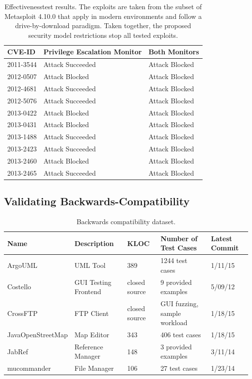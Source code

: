 \documentclass{sig-alternate}
\begin{document}
\begin{table}
\caption{Effectiveness\label{tab:Exploit-experiment-summary} test results.  The
  exploits are taken from the subset of Metasploit 4.10.0 that apply in modern
  environments and follow a drive-by-download paradigm.
  Taken together, the proposed security model restrictions stop all tested exploits.}
\begin{tabular}{l>{\raggedright}p{3cm}l}
\toprule 
\textbf{CVE-ID} & \textbf{Privilege Escalation Monitor} & \textbf{Both Monitors}\tabularnewline
\midrule
2011-3544 & Attack Succeeded  & Attack Blocked \\
2012-0507 & Attack Blocked & Attack Blocked \\
2012-4681 & Attack Succeeded  & Attack Blocked \\
2012-5076 & Attack Succeeded  & Attack Blocked \\
2013-0422 & Attack Blocked & Attack Blocked \\
2013-0431 & Attack Blocked & Attack Blocked \\
2013-1488 & Attack Succeeded  & Attack Blocked \\
2013-2423 & Attack Succeeded  & Attack Blocked \\
2013-2460 & Attack Blocked & Attack Blocked \\
2013-2465 & Attack Succeeded  & Attack Blocked \\
\bottomrule
\end{tabular}
\end{table}

\subsection{Validating Backwards-Compatibility}\label{sec:backcompat}
\begin{table}
\caption{\label{tab:validation-programs}
Backwards compatibility dataset.}
\centering

\begin{tabular}{lllll}
\toprule 
\textbf{Name} & \textbf{Description} & \textbf{KLOC} & \textbf{Number of Test Cases} & \textbf{Latest Commit}\tabularnewline
\midrule
ArgoUML & UML Tool & 389 & 1244 test cases & 1/11/15 \tabularnewline
Costello & GUI Testing Frontend & closed source & 9 provided examples & 5/09/12 \tabularnewline
CrossFTP & FTP Client & closed source & GUI fuzzing, sample workload & 1/18/15 \tabularnewline
JavaOpenStreetMap & Map Editor & 343 & 406 test cases & 1/18/15 \tabularnewline
JabRef & Reference Manager & 148 & 3 provided examples & 3/11/14 \tabularnewline 
mucommander & File Manager & 106 & 27 test cases & 1/23/14 \tabularnewline
\bottomrule
\end{tabular}
\vspace{-0.5cm}
\end{table}
\end{document}
